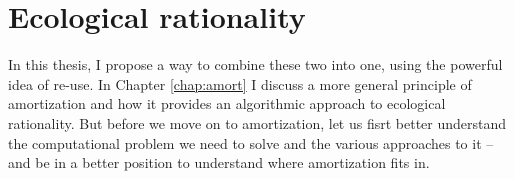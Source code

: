 \section{Ecological rationality}

In this thesis, I propose a way to combine these two into one, using the powerful idea of re-use. In Chapter \ref{chap:amort} I discuss a more general principle of amortization and how it provides an algorithmic approach to ecological rationality. But before we move on to amortization, let us fisrt better understand the computational problem we need to solve and the various approaches to it -- and be in a better position to understand where amortization fits in.



